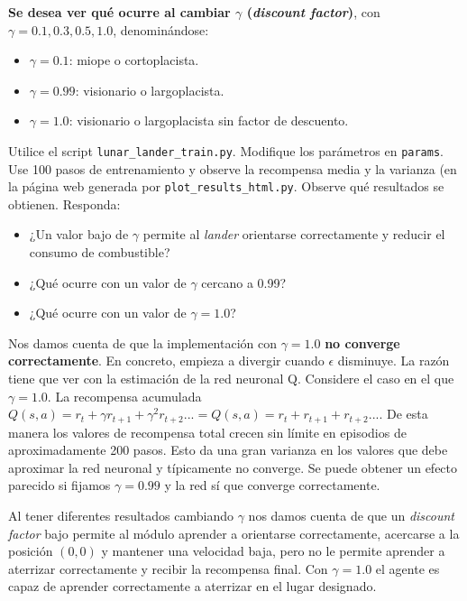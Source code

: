 \documentclass{article}
\begin{document}
\begin{exercise}
    \textbf{Se desea ver qué ocurre al cambiar $\gamma$ (\textit{discount factor})}, con $\gamma=0.1, 0.3, 0.5, 1.0$, denominándose:
    \begin{itemize}
        \item $\gamma = 0.1$: miope o cortoplacista.
        \item $\gamma = 0.99$: visionario o largoplacista.
        \item $\gamma = 1.0$: visionario o largoplacista sin factor de descuento.
    \end{itemize}
    Utilice el script \texttt{lunar\_lander\_train.py}. Modifique los parámetros en \texttt{params}. Use 100 pasos de entrenamiento y observe la recompensa media y la varianza (en la página web generada por \texttt{plot\_results\_html.py}. Observe qué resultados se  obtienen.  Responda:
    \begin{itemize}
        \item ¿Un valor bajo de $\gamma$ permite al \textit{lander} orientarse correctamente y reducir el consumo de combustible?
        \item ¿Qué ocurre con un valor de $\gamma$ cercano a 0.99?
        \item ¿Qué ocurre con un valor de $\gamma=1.0$?
    \end{itemize}
\end{exercise}
Nos damos cuenta de que la implementación con $\gamma=1.0$\textbf{ no converge correctamente}. En concreto, empieza a divergir cuando $\epsilon$ disminuye. La razón tiene que ver con la estimación de la red neuronal Q. Considere el caso en el que $\gamma = 1.0$. La recompensa acumulada $Q(s,a)=r_t+\gamma r_{t+1}+\gamma^2 r_{t+2} ...=Q(s,a)=r_t+ r_{t+1}+ r_{t+2} ...$. De esta manera los valores de recompensa total crecen sin límite en episodios de aproximadamente 200 pasos. Esto da una gran varianza en los valores que debe aproximar la red neuronal y típicamente no converge. Se puede obtener un efecto parecido si fijamos $\gamma=0.99$ y la red sí que converge correctamente.

Al tener diferentes resultados cambiando $\gamma$ nos damos cuenta de que un \textit{discount factor} bajo permite al módulo aprender a orientarse correctamente, acercarse a la posición $(0,0)$ y mantener una velocidad baja, pero no le permite aprender a aterrizar correctamente y recibir la recompensa final. Con $\gamma=1.0$ el agente es capaz de aprender correctamente a aterrizar en el lugar designado.
\end{document}
